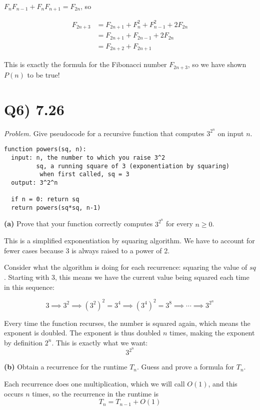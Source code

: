 \documentclass{article}
\begin{document}
$F_n F_{n-1} + F_n F_{n+1} = F_{2n}$, so 

\begin{align*}
  F_{2n+3}&= F_{2n+1} + F_n^2 + F_{n-1}^2 + 2F_{2n} \\
  &= F_{2n+1} + F_{2n-1} + 2F_{2n} \\
  &= F_{2n+2} + F_{2n+1}
\end{align*}

This is exactly the formula for the Fibonacci number $F_{2n+3}$, so we have shown $P(n)$ to be true!


\section*{Q6) 7.26}
\textit{Problem.} Give pseudocode for a recursive function that computes $3^{2^n}$ on input $n$.


\begin{verbatim}
function powers(sq, n):
  input: n, the number to which you raise 3^2
         sq, a running square of 3 (exponentiation by squaring)
          when first called, sq = 3
  output: 3^2^n

  if n = 0: return sq
  return powers(sq*sq, n-1)
\end{verbatim}

\noindent\textbf{(a)} Prove that your function correctly computes $3^{2^n}$ for every $n \geq 0$.

This is a simplified exponentiation by squaring algorithm. We have to account for fewer cases because 3 is always raised to a power of 2.

Consider what the algorithm is doing for each recurrence: squaring the value of $sq$. Starting with 3, this means we have the current value being squared each time in this sequence:

$$3 \implies 3^2 \implies (3^2)^2 = 3^4 \implies (3^4)^2 = 3^8 \implies \cdots \implies 3^{2^n}$$

Every time the function recurses, the number is squared again, which means the exponent is doubled. The exponent is thus doubled $n$ times, making the exponent by definition $2^n$. This is exactly what we want: $$3^{2^n}$$


\noindent\textbf{(b)} Obtain a recurrence for the runtime $T_n$. Guess and prove a formula for $T_n$.

Each recurrence does one multiplication, which we will call $O(1)$, and this occurs $n$ times, so the recurrence in the runtime is $$T_n = T_{n-1} + O(1)$$
\end{document}
